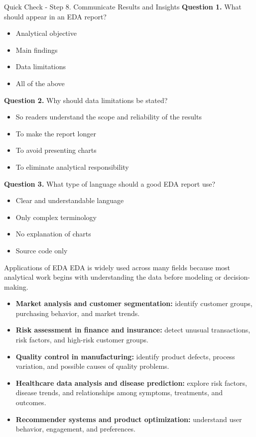 \documentclass[aspectratio=169,11pt]{beamer}
\begin{document}
\begin{frame}[allowframebreaks]{Quick Check - Step 8. Communicate Results and Insights}
\footnotesize
\textbf{Question 1.} What should appear in an EDA report?\par\medskip
\begin{itemize}
\item[\textbf{A.}] Analytical objective
\item[\textbf{B.}] Main findings
\item[\textbf{C.}] Data limitations
\item[\textbf{D.}] All of the above
\end{itemize}
\textbf{Question 2.} Why should data limitations be stated?\par\medskip
\begin{itemize}
\item[\textbf{A.}] So readers understand the scope and reliability of the results
\item[\textbf{B.}] To make the report longer
\item[\textbf{C.}] To avoid presenting charts
\item[\textbf{D.}] To eliminate analytical responsibility
\end{itemize}
\textbf{Question 3.} What type of language should a good EDA report use?\par\medskip
\begin{itemize}
\item[\textbf{A.}] Clear and understandable language
\item[\textbf{B.}] Only complex terminology
\item[\textbf{C.}] No explanation of charts
\item[\textbf{D.}] Source code only
\end{itemize}
\end{frame}

\begin{frame}[allowframebreaks]{Applications of EDA}
\small
EDA is widely used across many fields because most analytical work begins with understanding the data before modeling or decision-making.\par\medskip
\begin{itemize}
\item \textbf{Market analysis and customer segmentation:} identify customer groups, purchasing behavior, and market trends.
\item \textbf{Risk assessment in finance and insurance:} detect unusual transactions, risk factors, and high-risk customer groups.
\item \textbf{Quality control in manufacturing:} identify product defects, process variation, and possible causes of quality problems.
\item \textbf{Healthcare data analysis and disease prediction:} explore risk factors, disease trends, and relationships among symptoms, treatments, and outcomes.
\item \textbf{Recommender systems and product optimization:} understand user behavior, engagement, and preferences.
\end{itemize}
\end{frame}
\end{document}
